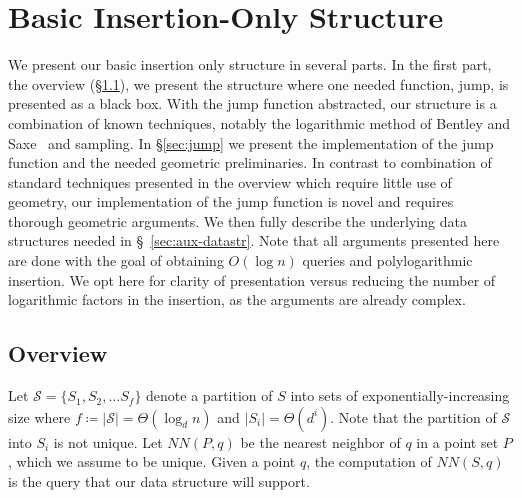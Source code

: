 \documentclass[10pt,a4paper]{amsart}
\newif\ifarxiv
\newif\ifsocg
\newcommand{\NN}{\mathit{NN}}
\newcommand{\mcS}{\mathcal{S}}
\begin{document}



\section{Basic Insertion-Only Structure}
\label{sec:basic-ins}

We present our basic insertion only structure in several parts. In the first part, the overview (\S \ref{sec:framework}), we present the structure where one needed function, jump, is presented as a black box. With the jump function abstracted, our structure is a combination of known techniques, notably
the logarithmic method of Bentley and Saxe~\cite{BentleyS80} and sampling. In \S\ref{sec:jump} we present the implementation of the jump function and the needed geometric preliminaries. In contrast to combination of standard techniques presented in the overview which require little use of geometry, our implementation of the jump function is novel and requires thorough geometric arguments.
We then fully describe the underlying data structures needed in \S~\ref{sec:aux-datastr}. Note that all arguments presented here are done with the goal of obtaining $O(\log n)$ queries and polylogarithmic insertion. We opt here for clarity of presentation versus reducing the number of logarithmic factors in the insertion, as the arguments are already complex. 

\subsection{Overview} \label{sec:framework}

\ifarxiv
All notation is summarized in Table~\ref{table-of-notation} which can be found on the last page, page~\pageref{table-of-notation}.
We let $S$ denote the set of points currently stored in the structure, and use $n$ to denote $|S|$.
In this section we set a constant $d$ to $2$. Even though for this section $d$ is fixed, we will express everything as a function of $d$ as the techniques used in Appendix~\ref{sec:ins-faster} will use non-constant $d$.
\fi
\ifsocg
We let $S$ denote the set of points currently stored in the structure, and use $n$ to denote $|S|$. In this section we set a constant $d$ to $2$. Even though for this section $d$ is fixed, we will express everything as a function of $d$.
\fi


Let $\mcS=\{ S_1, S_2, \ldots S_{f} \}$ denote a partition of $S$ into  sets of exponentially-increasing  size where $f \coloneqq |\mcS|=\Theta(\log_d n)$ and $|S_i|=\Theta(d^i)$. Note that the partition of $\mcS$ into $S_i$ is not unique.
Let $\NN(P,q)$ be the nearest neighbor of $q$ in a point set $P$, which we assume to be unique. Given a point $q$, the computation of $\NN(S,q)$ is the query that our data structure will support.
\end{document}

